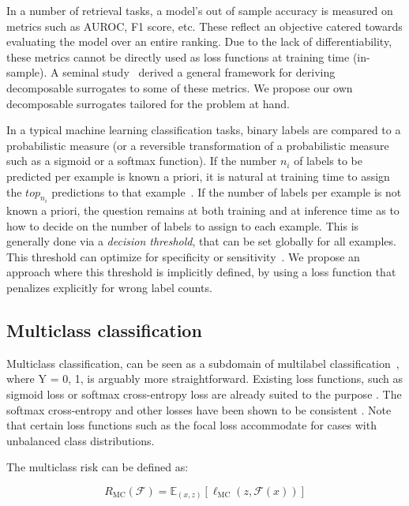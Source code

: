 In a number of retrieval tasks, a model's out of sample accuracy is measured
on metrics such as AUROC, F1 score, etc. These reflect an objective catered
towards evaluating the model over an entire ranking. Due to the lack of
differentiability, these metrics cannot be directly used as loss functions at
training time (in-sample). A seminal study~\cite{optimizableLosses} derived a
general framework for deriving decomposable surrogates to some of these
metrics. We propose our own decomposable surrogates tailored for the problem
at hand.

In a typical machine learning classification tasks, binary labels are compared to a probabilistic measure (or a reversible
transformation of a probabilistic measure such as a sigmoid or a softmax
function). If the number $n_i$ of labels to be predicted per
example is known a priori, it is natural at training time to assign the $top_{n_i}$ predictions
to that example~\cite{lossTopKError, topKmulticlassSVM}. If the number of
labels per example is not known a priori, the question remains at both training and at inference time
as to how to decide on the number of labels to assign to each
example. This is generally done via a \emph{decision threshold}, that can be set globally for all
examples. This threshold can optimize for specificity or
sensitivity~\cite{decisionThreshold}. We propose an approach where this threshold
is implicitly defined, by using a loss function that penalizes explicitly for wrong label counts.



\subsection{Multiclass classification}
\label{section:background:multiclassClassification}

Multiclass classification, can be seen as a subdomain of multilabel classification~\citep{multilabelReduction}, where Y = {0, 1}, is arguably more straightforward. Existing loss functions, such as sigmoid loss or softmax cross-entropy loss are already suited to the purpose . The softmax cross-entropy and other losses have been shown to be consistent \cite{consistency-multiclassSVM, consistency-lossAnalysis, consistency-surrogates}. Note that certain loss functions such as the focal loss accommodate for cases with unbalanced class distributions. 

The multiclass risk can be defined as:

\begin{equation}
R_{\mathrm{MC}}(\mathcal{F}) = \mathbb{E}_{(x, z)}\left[\ell_{\mathrm{MC}}(z, \mathcal{F}(x))\right]
\end{equation}

